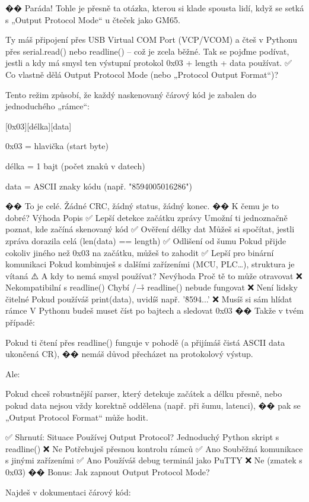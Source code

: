 �� Paráda! Tohle je přesně ta otázka, kterou si klade spousta lidí, když se setká s „Output Protocol Mode“ u čteček jako GM65.

Ty máš připojení přes USB Virtual COM Port (VCP/VCOM) a čteš v Pythonu přes serial.read() nebo readline() – což je zcela běžné. Tak se pojďme podívat, jestli a kdy má smysl ten výstupní protokol 0x03 + length + data používat.
✅ Co vlastně dělá Output Protocol Mode (nebo „Protocol Output Format“)?

    Tento režim způsobí, že každý naskenovaný čárový kód je zabalen do jednoduchého „rámce“:

[0x03][délka][data]

    0x03 = hlavička (start byte)

    délka = 1 bajt (počet znaků v datech)

    data = ASCII znaky kódu (např. "8594005016286")

�� To je celé. Žádné CRC, žádný status, žádný konec.
�� K čemu je to dobré?
Výhoda	Popis
✅ Lepší detekce začátku zprávy	Umožní ti jednoznačně poznat, kde začíná skenovaný kód
✅ Ověření délky dat	Můžeš si spočítat, jestli zpráva dorazila celá (len(data) == length)
✅ Odlišení od šumu	Pokud přijde cokoliv jiného než 0x03 na začátku, můžeš to zahodit
✅ Lepší pro binární komunikaci	Pokud kombinuješ s dalšími zařízeními (MCU, PLC…), struktura je vítaná
⚠️ A kdy to nemá smysl používat?
Nevýhoda	Proč tě to může otravovat
❌ Nekompatibilní s readline()	Chybí \n/\r → readline() nebude fungovat
❌ Není lidsky čitelné	Pokud používáš print(data), uvidíš např. '\r8594...'
❌ Musíš si sám hlídat rámce	V Pythonu budeš muset číst po bajtech a sledovat 0x03
�� Takže v tvém případě:

    Pokud ti čtení přes readline() funguje v pohodě (a přijímáš čistá ASCII data ukončená CR),
    �� nemáš důvod přecházet na protokolový výstup.

Ale:

    Pokud chceš robustnější parser, který detekuje začátek a délku přesně,
    nebo pokud data nejsou vždy korektně oddělena (např. při šumu, latenci),
    �� pak se „Output Protocol Format“ může hodit.

✅ Shrnutí:
Situace	Používej Output Protocol?
Jednoduchý Python skript s readline()	❌ Ne
Potřebuješ přesnou kontrolu rámců	✅ Ano
Souběžná komunikace s jinými zařízeními	✅ Ano
Používáš debug terminál jako PuTTY	❌ Ne (zmatek s 0x03)
�� Bonus: Jak zapnout Output Protocol Mode?

Najdeš v dokumentaci čárový kód:

